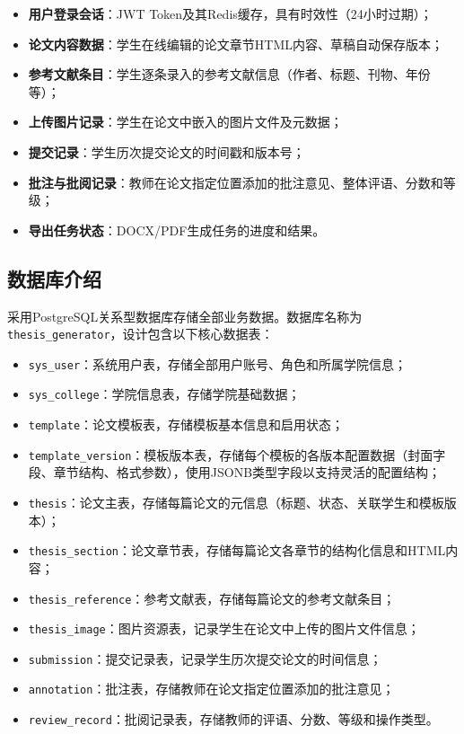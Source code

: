 \documentclass{../../softeng}
\begin{document}
\begin{itemize}
    \item \textbf{用户登录会话}：JWT Token及其Redis缓存，具有时效性（24小时过期）；
    \item \textbf{论文内容数据}：学生在线编辑的论文章节HTML内容、草稿自动保存版本；
    \item \textbf{参考文献条目}：学生逐条录入的参考文献信息（作者、标题、刊物、年份等）；
    \item \textbf{上传图片记录}：学生在论文中嵌入的图片文件及元数据；
    \item \textbf{提交记录}：学生历次提交论文的时间戳和版本号；
    \item \textbf{批注与批阅记录}：教师在论文指定位置添加的批注意见、整体评语、分数和等级；
    \item \textbf{导出任务状态}：DOCX/PDF生成任务的进度和结果。
\end{itemize}

\subsection{数据库介绍}

采用PostgreSQL关系型数据库存储全部业务数据。数据库名称为\verb|thesis_generator|，设计包含以下核心数据表：

\begin{itemize}
    \item \verb|sys_user|：系统用户表，存储全部用户账号、角色和所属学院信息；
    \item \verb|sys_college|：学院信息表，存储学院基础数据；
    \item \verb|template|：论文模板表，存储模板基本信息和启用状态；
    \item \verb|template_version|：模板版本表，存储每个模板的各版本配置数据（封面字段、章节结构、格式参数），使用JSONB类型字段以支持灵活的配置结构；
    \item \verb|thesis|：论文主表，存储每篇论文的元信息（标题、状态、关联学生和模板版本）；
    \item \verb|thesis_section|：论文章节表，存储每篇论文各章节的结构化信息和HTML内容；
    \item \verb|thesis_reference|：参考文献表，存储每篇论文的参考文献条目；
    \item \verb|thesis_image|：图片资源表，记录学生在论文中上传的图片文件信息；
    \item \verb|submission|：提交记录表，记录学生历次提交论文的时间信息；
    \item \verb|annotation|：批注表，存储教师在论文指定位置添加的批注意见；
    \item \verb|review_record|：批阅记录表，存储教师的评语、分数、等级和操作类型。
\end{itemize}
\end{document}
